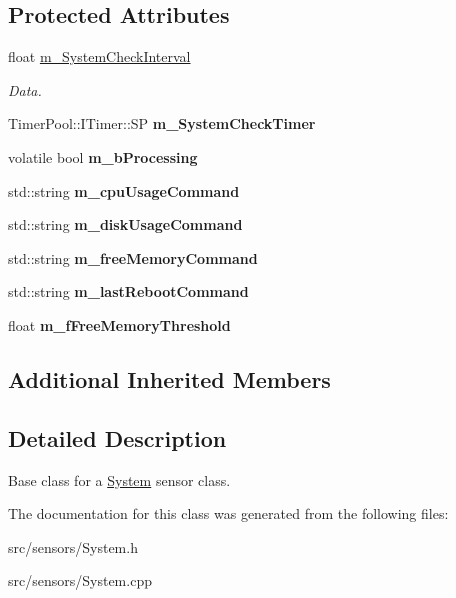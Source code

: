 \subsection*{Protected Attributes}
\begin{DoxyCompactItemize}
\item 
\mbox{\label{class_system_ab9e9c5915c47645b7de9431223eb0306}} 
float \hyperlink{class_system_ab9e9c5915c47645b7de9431223eb0306}{m\+\_\+\+System\+Check\+Interval}
\begin{DoxyCompactList}\small\item\em Data. \end{DoxyCompactList}\item 
\mbox{\label{class_system_aa626fe225f7c8983ab88e1235e4c3851}} 
Timer\+Pool\+::\+I\+Timer\+::\+SP {\bfseries m\+\_\+\+System\+Check\+Timer}
\item 
\mbox{\label{class_system_af7a055f6195aa2edf75b779791299cf9}} 
volatile bool {\bfseries m\+\_\+b\+Processing}
\item 
\mbox{\label{class_system_afa4d0c4ecdf7d4f5b2986fce1c52c0e3}} 
std\+::string {\bfseries m\+\_\+cpu\+Usage\+Command}
\item 
\mbox{\label{class_system_ab913673a1fb4f3a77fb040410531009d}} 
std\+::string {\bfseries m\+\_\+disk\+Usage\+Command}
\item 
\mbox{\label{class_system_ab2b6073e862628249461f02d4aa8924c}} 
std\+::string {\bfseries m\+\_\+free\+Memory\+Command}
\item 
\mbox{\label{class_system_acf092d80220c1081f2d59366cb3b3cf6}} 
std\+::string {\bfseries m\+\_\+last\+Reboot\+Command}
\item 
\mbox{\label{class_system_a9a281c63600aa4fd0c530f0c8e6c7732}} 
float {\bfseries m\+\_\+f\+Free\+Memory\+Threshold}
\end{DoxyCompactItemize}
\subsection*{Additional Inherited Members}


\subsection{Detailed Description}
Base class for a \hyperlink{class_system}{System} sensor class. 

The documentation for this class was generated from the following files\+:\begin{DoxyCompactItemize}
\item 
src/sensors/System.\+h\item 
src/sensors/System.\+cpp\end{DoxyCompactItemize}
